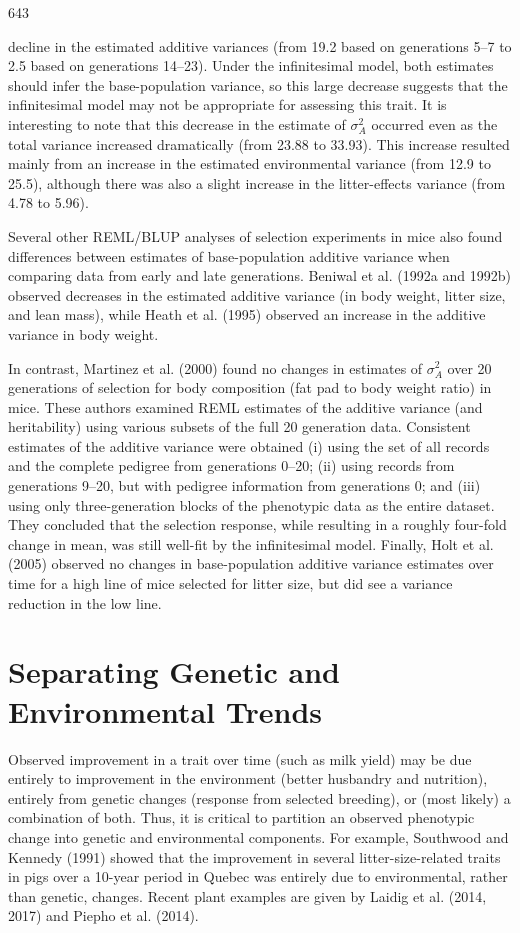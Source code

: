 \documentclass{article}
\begin{document}
643

decline in the estimated additive variances (from 19.2 based on generations 5–7 to 2.5 based on generations 14–23). Under the infinitesimal model, both estimates should infer the base-population variance, so this large decrease suggests that the infinitesimal model may not be appropriate for assessing this trait. It is interesting to note that this decrease in the estimate of  $ \sigma_{A}^{2} $ occurred even as the total variance increased dramatically (from 23.88 to 33.93). This increase resulted mainly from an increase in the estimated environmental variance (from 12.9 to 25.5), although there was also a slight increase in the litter-effects variance (from 4.78 to 5.96).

Several other REML/BLUP analyses of selection experiments in mice also found differences between estimates of base-population additive variance when comparing data from early and late generations. Beniwal et al. (1992a and 1992b) observed decreases in the estimated additive variance (in body weight, litter size, and lean mass), while Heath et al. (1995) observed an increase in the additive variance in body weight.

In contrast, Martinez et al. (2000) found no changes in estimates of  $ \sigma_{A}^{2} $ over 20 generations of selection for body composition (fat pad to body weight ratio) in mice. These authors examined REML estimates of the additive variance (and heritability) using various subsets of the full 20 generation data. Consistent estimates of the additive variance were obtained (i) using the set of all records and the complete pedigree from generations 0–20; (ii) using records from generations 9–20, but with pedigree information from generations 0; and (iii) using only three-generation blocks of the phenotypic data as the entire dataset. They concluded that the selection response, while resulting in a roughly four-fold change in mean, was still well-fit by the infinitesimal model. Finally, Holt et al. (2005) observed no changes in base-population additive variance estimates over time for a high line of mice selected for litter size, but did see a variance reduction in the low line.

\section{Separating Genetic and Environmental Trends}
Observed improvement in a trait over time (such as milk yield) may be due entirely to improvement in the environment (better husbandry and nutrition), entirely from genetic changes (response from selected breeding), or (most likely) a combination of both. Thus, it is critical to partition an observed phenotypic change into genetic and environmental components. For example, Southwood and Kennedy (1991) showed that the improvement in several litter-size-related traits in pigs over a 10-year period in Quebec was entirely due to environmental, rather than genetic, changes. Recent plant examples are given by Laidig et al. (2014, 2017) and Piepho et al. (2014).
\end{document}
